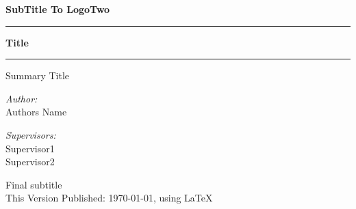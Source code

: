 \begin{titlepage}
\begin{center}
\textbf{\LARGE{SubTitle To LogoTwo}}
\vspace{2cm}
\hrule
\vspace{0.5cm}
{\Huge \textbf{Title}} \\[0.5cm]
\hrule
\vspace{0.5cm}
\LARGE{Summary Title}
\vspace{2.5cm}

\begin{minipage}{0.4\textwidth}
\begin{flushleft} 
\LARGE \emph{Author:}\\ Authors Name
\end{flushleft}
\end{minipage}
\begin{minipage}{0.4\textwidth}
\begin{flushright}
\LARGE \emph{Supervisors:} \\ Supervisor1 \\ Supervisor2
\end{flushright}
\end{minipage}

\vfill

\large {Final subtitle}\\
This Version Published: \today, using \LaTeX


\end{center}
\end{titlepage}

